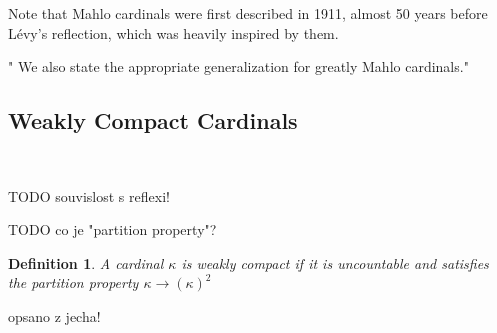 \documentclass[12pt,a4paper]{article}
\newtheorem{theorem}{Theorem}[section]
\newtheorem{definition}[theorem]{Definition}
\newtheorem{lemma}[theorem]{Lemma}
\newenvironment{proof}
{\noindent \textit{Proof.}}
{\hspace*{\fill} $\Box$}
\newcommand{\then}{\rightarrow}
\begin{document}
Note that Mahlo cardinals were first described in 1911, almost 50 years before Lévy's reflection, which was heavily inspired by them.

" We also state the appropriate generalization for greatly Mahlo cardinals." %

\subsection{Weakly Compact Cardinals}

\

TODO souvislost s reflexi!

TODO co je "partition property"?

\begin{definition}
A cardinal $\kappa$ is \emph{weakly compact} if it is uncountable and satisfies the partition property $\kappa \then (\kappa)^2$
\end{definition}
{\color{red}
opsano z jecha!
\begin{comment}

\begin{lemma}
Every weakly compact cardinal is inaccessible
\end{lemma}

\begin{proof}
Let $\kappa$ b a~weakly compact cardinal. To show that $\kappa$ is regular, let us assume that $\kappa$ i the disjoint union
$\bigcup\{A_{\gamma}: \gamma < \lambda\}$ such that $\lambda < \kappa$ and $|A_{\gamma}| < \kappa$ for each $\gamma < \lambda$.
 We define a~partition $F: [\kappa]^2 \then \{0, 1\}$ as follows: $F(\{\alpha, \beta\}) = 0$ just in cas $\alpha$ and $\beta$ are the same size $A_{\gamma}$. Obviously, this partition does not have a~homogenous set $H \subset \kappa$ of size $\kappa$.
That $\kappa$ is a~strong limit cardinal follows from Lemma 9.4: (?? doplnit z jecha): If $\kappa \geq 2^{\lambda}$ for some $\lambda < \kappa$,
the because $2^{\lambda} \leq (\lambda^{+})^2$, we have $\kappa \leq (\lambda^{+})^2$ and hence $\kappa \leq (\kappa)^2$.
\end{proof}

\

\end{comment}
}

{\color{red}
\begin{comment}


\begin{theorem}\label{th:refl_weakly_compact}
Let $\kappa$ be a~weakly compact cardinal. Then for every stationary set $S \subset \kappa$ there is an uncountable regular cardinal $\lambda < \kappa$ such that the set $S \cap \lambda$ is stationary in $\lambda$.
\end{theorem}
\begin{proof}
TODO
\end{proof}

\

\end{comment}
}
\end{document}
